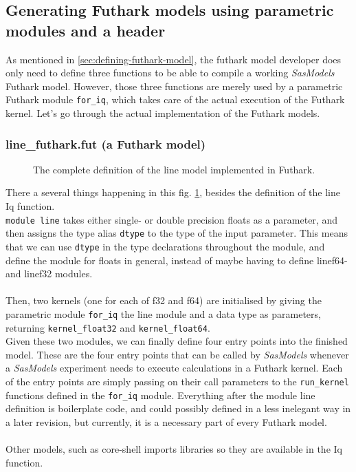 \documentclass[11pt]{article}
\newcommand{\sasmodels}{\textit{SasModels}}
\newcommand{\foriq}{\texttt{for\_iq}}
\begin{document}
\subsection{Generating Futhark models using parametric modules and a header}
\label{sec:generating-futhark}
As mentioned in \ref{sec:defining-futhark-model}, the futhark model developer
does only need to define three functions to be able to compile a working 
\sasmodels{} Futhark model.
However, those three functions are merely used by a parametric Futhark module 
\foriq{}, which takes care of the actual execution of the 
Futhark kernel.
Let's go through the actual implementation of the Futhark models.

\subsubsection{line\_futhark.fut (a Futhark model)}
\label{sec:line-fut}

\begin{figure}
  
  \caption{The complete definition of the line model implemented in Futhark.}
  \label{fig:linemodel-futhark-full}
\end{figure}

There a several things happening in this fig. \ref{fig:linemodel-futhark-full}, 
besides the definition of the line Iq function.
\\
\texttt{module line} takes either single- or double precision floats as a
parameter, and then assigns the type alias \texttt{dtype} to the type of the
input parameter. This means that we can use \texttt{dtype} in the type
declarations throughout the module, and define the module for floats in general,
instead of maybe having to define linef64- and linef32 modules.
\\\\
Then, two kernels (one for each of f32 and f64) are initialised by giving
the parametric module \texttt{for\_iq} the line module and a data type 
as parameters, returning \texttt{kernel\_float32} and \texttt{kernel\_float64}.
\\
Given these two modules, we can finally define four entry points into the
finished model. These are the four entry points that can be called by 
\sasmodels{} whenever a \sasmodels{} experiment needs to execute calculations 
in a Futhark kernel.
Each of the entry points are simply passing on their call parameters to the 
\texttt{run\_kernel} functions defined in the \texttt{for\_iq} module.
Everything after the module line definition is boilerplate code, and could
possibly defined in a less inelegant way in a later revision, but currently, it 
is a necessary part of every Futhark model.
\\\\
Other models, such as core-shell imports libraries so they are 
available in the Iq function.
\end{document}
